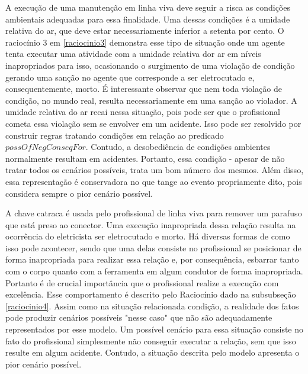 A execução de uma manutenção em linha viva deve seguir a risca as condições ambientais adequadas para essa finalidade. Uma dessas condições é a umidade relativa do ar, que deve estar necessariamente inferior a setenta por cento. O raciocínio 3 em \ref{raciocinio3} demonstra esse tipo de situação onde um agente tenta executar uma atividade com a umidade relativa dor ar em níveis inapropriados para isso, ocasionando o surgimento de uma violação de condição gerando uma sanção no agente que corresponde a ser eletrocutado e, consequentemente, morto. É interessante observar que nem toda violação de condição, no mundo real, resulta necessariamente em uma sanção ao violador. A umidade relativa do ar recai nessa situação, pois pode ser que o profissional cometa essa violação sem se envolver em um acidente. Isso pode ser resolvido por construir regras tratando condições em relação ao predicado $possOfNegConseqFor$. Contudo, a desobediência de condições ambientes normalmente resultam em acidentes. Portanto, essa condição - apesar de não tratar todos os cenários possíveis, trata um bom número dos mesmos. Além disso, essa representação é conservadora no que tange ao evento propriamente dito, pois considera sempre o pior 
cenário possível.

A chave catraca é usada pelo profissional de linha viva para remover um parafuso que está preso ao conector. Uma execução inapropriada dessa relação resulta na ocorrência do eletricista ser eletrocutado e morto. Há diversas formas de como isso pode acontecer, sendo que uma delas consiste no profissional se posicionar de forma inapropriada para realizar essa relação e, por consequência, esbarrar tanto com o corpo quanto com a ferramenta em algum condutor de forma inapropriada. Portanto é de crucial importância que o profissional realize a execução com excelência. Esse comportamento é descrito pelo Raciocínio dado na subsubseção \ref{raciocinio4}. Assim como na situação relacionada condição, a realidade dos fatos pode produzir cenários possíveis "nesse caso" que não são adequadamente representados por esse modelo. Um possível cenário para essa situação consiste no fato do profissional simplesmente não conseguir executar a relação, sem que isso resulte em algum acidente. Contudo, a situação descrita pelo modelo apresenta o pior cenário possível. 

